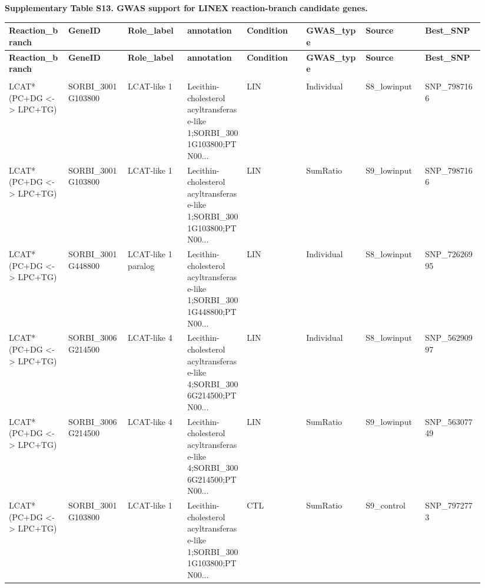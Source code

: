 \clearpage
\begin{landscape}
\begingroup
\scriptsize
\setlength{\LTleft}{0pt}
\setlength{\LTright}{0pt}
\setlength{\tabcolsep}{3pt}
\renewcommand{\arraystretch}{1.08}
\noindent\textbf{Supplementary Table S13. GWAS support for LINEX reaction-branch candidate genes.}
\par\medskip
\begin{longtable}{>{\raggedright\arraybackslash}p{0.117\linewidth}>{\raggedright\arraybackslash}p{0.117\linewidth}>{\raggedright\arraybackslash}p{0.117\linewidth}>{\raggedright\arraybackslash}p{0.117\linewidth}>{\raggedright\arraybackslash}p{0.117\linewidth}>{\raggedright\arraybackslash}p{0.117\linewidth}>{\raggedright\arraybackslash}p{0.117\linewidth}>{\raggedright\arraybackslash}p{0.117\linewidth}}
\toprule
\textbf{Reaction\_branch} & \textbf{GeneID} & \textbf{Role\_label} & \textbf{annotation} & \textbf{Condition} & \textbf{GWAS\_type} & \textbf{Source} & \textbf{Best\_SNP} \\
\midrule
\endfirsthead
\toprule
\textbf{Reaction\_branch} & \textbf{GeneID} & \textbf{Role\_label} & \textbf{annotation} & \textbf{Condition} & \textbf{GWAS\_type} & \textbf{Source} & \textbf{Best\_SNP} \\
\midrule
\endhead
\midrule
\multicolumn{8}{r}{Continued on next page} \\
\endfoot
\bottomrule
\endlastfoot
LCAT* (PC+DG <-> LPC+TG) & SORBI\_3001G103800 & LCAT-like 1 & Lecithin-cholesterol acyltransferase-like 1;SORBI\_3001G103800;PTN00... & LIN & Individual & S8\_lowinput & SNP\_7987166 \\
LCAT* (PC+DG <-> LPC+TG) & SORBI\_3001G103800 & LCAT-like 1 & Lecithin-cholesterol acyltransferase-like 1;SORBI\_3001G103800;PTN00... & LIN & SumRatio & S9\_lowinput & SNP\_7987166 \\
LCAT* (PC+DG <-> LPC+TG) & SORBI\_3001G448800 & LCAT-like 1 paralog & Lecithin-cholesterol acyltransferase-like 1;SORBI\_3001G448800;PTN00... & LIN & Individual & S8\_lowinput & SNP\_72626995 \\
LCAT* (PC+DG <-> LPC+TG) & SORBI\_3006G214500 & LCAT-like 4 & Lecithin-cholesterol acyltransferase-like 4;SORBI\_3006G214500;PTN00... & LIN & Individual & S8\_lowinput & SNP\_56290997 \\
LCAT* (PC+DG <-> LPC+TG) & SORBI\_3006G214500 & LCAT-like 4 & Lecithin-cholesterol acyltransferase-like 4;SORBI\_3006G214500;PTN00... & LIN & SumRatio & S9\_lowinput & SNP\_56307749 \\
LCAT* (PC+DG <-> LPC+TG) & SORBI\_3001G103800 & LCAT-like 1 & Lecithin-cholesterol acyltransferase-like 1;SORBI\_3001G103800;PTN00... & CTL & SumRatio & S9\_control & SNP\_7972773 \\

\end{longtable}
\end{landscape}
